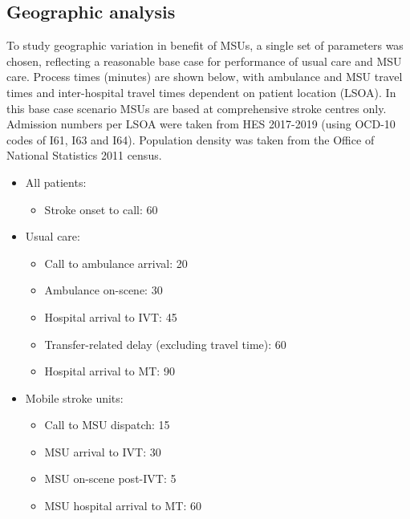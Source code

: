 \subsection{Geographic analysis}

To study geographic variation in benefit of MSUs, a single set of parameters was chosen, reflecting a reasonable base case for performance of usual care and MSU care. Process times (minutes) are shown below, with ambulance and MSU travel times and inter-hospital travel times dependent on patient location (LSOA). In this base case scenario MSUs are based at comprehensive stroke centres only. Admission numbers per LSOA were taken from HES 2017-2019 (using OCD-10 codes of I61, I63 and I64). Population density was taken from the Office of National Statistics 2011 census.


\begin{minipage}{1.0\textwidth}  %
\begin{spacing}{1.2}
\begin{itemize}
    \item All patients:
    \begin{itemize}
        \item Stroke onset to call: 60
    \end{itemize}
    \item Usual care:
    \begin{itemize}
        \item Call to ambulance arrival: 20
        \item Ambulance on-scene: 30
        \item Hospital arrival to IVT: 45
        \item Transfer-related delay (excluding travel time): 60
        \item Hospital arrival to MT: 90
    \end{itemize}
    \item Mobile stroke units:
    \begin{itemize}
        \item Call to MSU dispatch: 15
        \item MSU arrival to IVT: 30
        \item MSU on-scene post-IVT: 5
        \item MSU hospital arrival to MT: 60
    \end{itemize}
\end{itemize}
\end{spacing}
\end{minipage}


